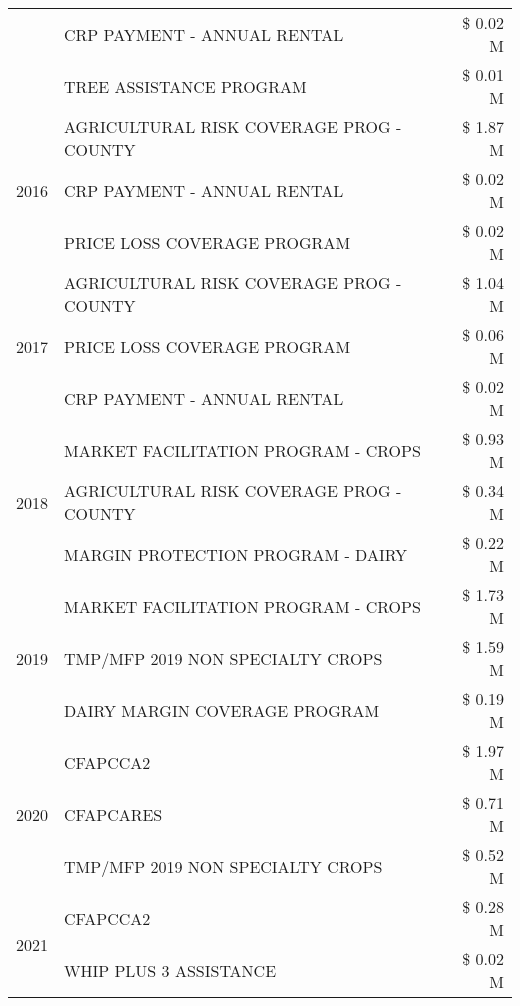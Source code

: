 \begin{tabular}{llr}
 & CRP PAYMENT - ANNUAL RENTAL & \$ 0.02 M \\
 & TREE ASSISTANCE PROGRAM & \$ 0.01 M \\
\cline{1-3}
\multirow[t]{3}{*}{2016} & AGRICULTURAL RISK COVERAGE PROG - COUNTY & \$ 1.87 M \\
 & CRP PAYMENT - ANNUAL RENTAL & \$ 0.02 M \\
 & PRICE LOSS COVERAGE PROGRAM & \$ 0.02 M \\
\cline{1-3}
\multirow[t]{3}{*}{2017} & AGRICULTURAL RISK COVERAGE PROG - COUNTY & \$ 1.04 M \\
 & PRICE LOSS COVERAGE PROGRAM & \$ 0.06 M \\
 & CRP PAYMENT - ANNUAL RENTAL & \$ 0.02 M \\
\cline{1-3}
\multirow[t]{3}{*}{2018} & MARKET FACILITATION PROGRAM - CROPS & \$ 0.93 M \\
 & AGRICULTURAL RISK COVERAGE PROG - COUNTY & \$ 0.34 M \\
 & MARGIN PROTECTION PROGRAM - DAIRY & \$ 0.22 M \\
\cline{1-3}
\multirow[t]{3}{*}{2019} & MARKET FACILITATION PROGRAM - CROPS & \$ 1.73 M \\
 & TMP/MFP 2019 NON SPECIALTY CROPS & \$ 1.59 M \\
 & DAIRY MARGIN COVERAGE PROGRAM & \$ 0.19 M \\
\cline{1-3}
\multirow[t]{3}{*}{2020} & CFAPCCA2 & \$ 1.97 M \\
 & CFAPCARES & \$ 0.71 M \\
 & TMP/MFP 2019 NON SPECIALTY CROPS & \$ 0.52 M \\
\cline{1-3}
\multirow[t]{2}{*}{2021} & CFAPCCA2 & \$ 0.28 M \\
 & WHIP PLUS 3 ASSISTANCE & \$ 0.02 M \\
\cline{1-3}
\bottomrule
\end{tabular}
